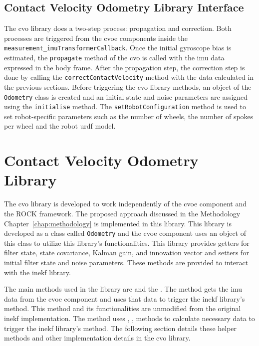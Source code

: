 \documentclass[report.tex]{subfiles}
\begin{document}
    \subsection{Contact Velocity Odometry Library Interface}

    The \gls{cvo} library does a two-step process: propagation and correction. Both processes are triggered from the \gls{cvoe} components inside the \texttt{measurement\_imuTransformerCallback}. Once the initial gyroscope bias is estimated, the \texttt{propagate} method of the \gls{cvo} is called with the \gls{imu} data expressed in the body frame. After the propagation step, the correction step is done by calling the \texttt{correctContactVelocity} method with the data calculated in the previous sections. Before triggering the \gls{cvo} library methods, an object of the \texttt{Odometry} class is created and an initial state and noise parameters are assigned using the \texttt{initialise} method. The \texttt{setRobotConfiguration} method is used to set robot-specific parameters such as the number of wheels, the number of spokes per wheel and the robot \gls{urdf} model. 

\section{Contact Velocity Odometry Library}

    The \gls{cvo} library is developed to work independently of the \gls{cvoe} component and the ROCK framework. The proposed approach discussed in the Methodology Chapter~\ref{chap:methodology} is implemented in this library. This library is developed as a class called \texttt{Odometry} and the \gls{cvoe} component uses an object of this class to utilize this library's functionalities. This library provides getters for filter state, state covariance, Kalman gain, and innovation vector and setters for initial filter state and noise parameters. These methods are provided to interact with the \gls{inekf} library. 
    
    The main methods used in the library are  and the . The  method gets the \gls{imu} data from the \gls{cvoe} component and uses that data to trigger the \gls{inekf} library's  method. This method and its functionalities are unmodified from the original \gls{inekf} implementation. The  method uses , ,  methods to calculate necessary data to trigger the \gls{inekf} library's  method. The following section details these helper methods and other implementation details in the \gls{cvo} library.
        
\end{document}
